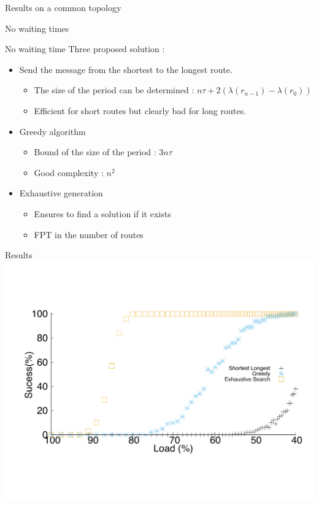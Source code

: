 \documentclass[10 pt]{beamer}
\begin{document}
\begin{section}{Results on a common topology}
\begin{subsection}{No waiting times}
\begin{frame}{No waiting time }
Three proposed solution :
\begin{itemize}
\item Send the message from the shortest to the longest route.
\begin{itemize}
\item The size of the period can be determined : $n\tau + 2(\lambda(r_{n-1}) - \lambda(r_{0}))$
\item Efficient for short routes but clearly bad for long routes.
\end{itemize}
\vspace{0.5cm}
\pause
\item Greedy algorithm
\begin{itemize}
\item Bound of the size of the period : $3n\tau$
\item Good complexity : $n^2$
\end{itemize}
\vspace{0.5cm}
\pause
\item Exhaustive generation
\begin{itemize}
\item Ensures to find a solution if it exists
\item FPT in the number of routes
\end{itemize}
\end{itemize}
\end{frame}


\begin{frame}{Results}
\centering
  \includegraphics[scale=0.4]{echec_longues}\\
  \vspace{1cm}
  

\end{frame}
\end{subsection}
\end{section}
\end{document}
